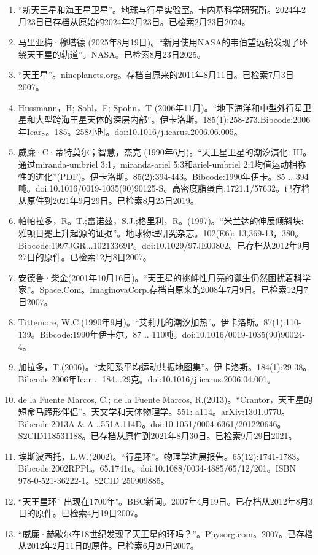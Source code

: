 \begin{enumerate}
\item “新天王星和海王星卫星”。地球与行星实验室。卡内基科学研究所。2024年2月23日已存档从原始的2024年2月23日。已检索2月23日2024。
\item 马里亚梅·穆塔德 (2025年8月19日)。“新月使用NASA的韦伯望远镜发现了环绕天王星的轨道”。NASA。已检索8月23日2025。
\item “天王星”。nineplanets.org。存档自原来的2011年8月11日。已检索7月3日2007。
\item Hussmann，H; Sohl，F; Spohn，T (2006年11月)。“地下海洋和中型外行星卫星和大型跨海王星天体的深层内部”。伊卡洛斯。185(1):258-273.Bibcode:2006年Icar。。185。258小时。doi:10.1016/j.icarus.2006.06.005。
\item 威廉·C·蒂特莫尔；智慧，杰克 (1990年6月)。“天王星卫星的潮汐演化: III。通过miranda-umbriel 3:1，miranda-ariel 5:3和ariel-umbriel 2:1均值运动相称性的进化”(PDF)。伊卡洛斯。85(2):394-443。Bibcode:1990年伊卡。85 .. 394吨。doi:10.1016/0019-1035(90)90125-S。高密度脂蛋白:1721.1/57632。已存档从原件到2021年9月29日。已检索8月25日2019。
\item 帕帕拉多，R。T.;雷诺兹，S.J.;格里利，R。(1997)。“米兰达的伸展倾斜块: 雅顿日冕上升起源的证据”。地球物理研究杂志。102(E6): 13,369-13，380。Bibcode:1997JGR...10213369P。doi:10.1029/97JE00802。已存档从2012年9月27日的原件。已检索12月8日2007。
\item 安德鲁·柴金(2001年10月16日)。“天王星的挑衅性月亮的诞生仍然困扰着科学家”。Space.Com。ImaginovaCorp.存档自原来的2008年7月9日。已检索12月7日2007。
\item Tittemore, W.C.(1990年9月)。“艾莉儿的潮汐加热”。伊卡洛斯。87(1):110-139。Bibcode:1990年伊卡尔。87 .. 110吨。doi:10.1016/0019-1035(90)90024-4。
\item 加拉多，T.(2006)。“太阳系平均运动共振地图集”。伊卡洛斯。184(1):29-38。Bibcode:2006年Icar .. 184...29克。doi:10.1016/j.icarus.2006.04.001。
\item de la Fuente Marcos, C.; de la Fuente Marcos, R.(2013)。“Crantor，天王星的短命马蹄形伴侣”。天文学和天体物理学。551: a114。arXiv:1301.0770。Bibcode:2013A & A...551A.114D。doi:10.1051/0004-6361/201220646。S2CID118531188。已存档从原件到2021年8月30日。已检索9月29日2021。 
\item 埃斯波西托，L.W.(2002)。“行星环”。物理学进展报告。65(12):1741-1783。Bibcode:2002RPPh。65.1741e。doi:10.1088/0034-4885/65/12/201。ISBN  978-0-521-36222-1。S2CID 250909885。
\item “天王星环” 出现在1700年"。BBC新闻。2007年4月19日。已存档从2012年8月3日的原件。已检索4月19日2007。
\item “威廉·赫歇尔在18世纪发现了天王星的环吗？”。Physorg.com。2007。已存档从2012年2月11日的原件。已检索6月20日2007。

\end{enumerate}
